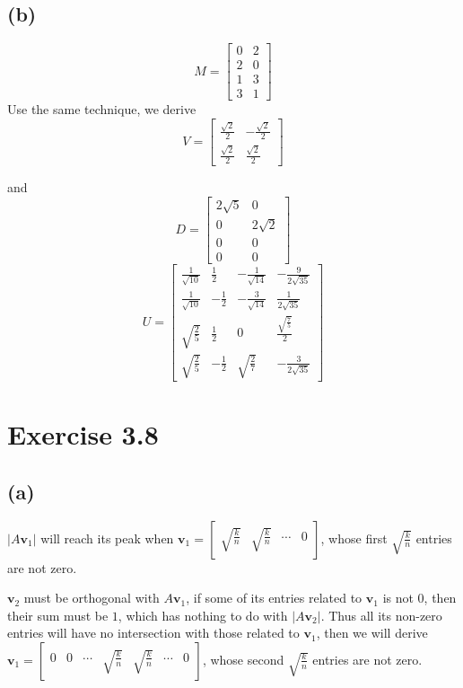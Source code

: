 \documentclass[paper=a4, fontsize=11pt]{scrartcl} %
\numberwithin{equation}{section} %
\numberwithin{figure}{section} %
\numberwithin{table}{section} %
\begin{document}
\subsection*{(b)}
$$ M = \begin{bmatrix}0 & 2 \\ 2 & 0 \\ 1 & 3 \\ 3 & 1\end{bmatrix}$$
Use the same technique, we derive 
$$V = \begin{bmatrix}\frac{\sqrt{2}}{2} & -\frac{\sqrt{2}}{{2}} \\ \frac{\sqrt{2}}{2} & \frac{\sqrt{2}}{2} \end{bmatrix} $$

and $$D = \begin{bmatrix}2\sqrt{5} & 0 \\ 0 & 2\sqrt{2} \\ 0 & 0 \\ 0 & 0 \end{bmatrix} $$
$$U = \begin{bmatrix} 
\frac{1}{\sqrt{10}} & \frac{1}{2} & -\frac{1}{\sqrt{14}} & -\frac{9}{2\sqrt{35}}	\\
\frac{1}{\sqrt{10}} & -\frac{1}{2} & -\frac{3}{\sqrt{14}} & \frac{1}{2\sqrt{35}}	\\
\sqrt{\frac{2}{5}} & \frac{1}{2} & 0 & \frac{\sqrt{\frac{7}{5}}}{2}	\\
\sqrt{\frac{2}{5}} & -\frac{1}{2} & \sqrt{\frac{2}{7}} & -\frac{3}{2\sqrt{35}}
\end{bmatrix} $$
\section*{Exercise 3.8}
\subsection*{(a)}
$|A\mathbf{v}_1|$ will reach its peak when $\mathbf{v}_1 = \begin{bmatrix}\sqrt{\frac{k}{n}} & \sqrt{\frac{k}{n}} & \cdots & 0\end{bmatrix}$, whose first $\sqrt{\frac{k}{n}}$ entries are not zero.

$\mathbf{v}_2$ must be orthogonal with $A\mathbf{v}_1$, if some of its entries related to $\mathbf{v}_1$ is not $0$, then their sum must be $1$, which has nothing to do with $|A\mathbf{v}_2|$. Thus all its non-zero entries will have no intersection with those related to $\mathbf{v}_1$, then we will derive $\mathbf{v}_1 = \begin{bmatrix}0 & 0 & \cdots & \sqrt{\frac{k}{n}} & \sqrt{\frac{k}{n}} & \cdots & 0\end{bmatrix}$, whose second $\sqrt{\frac{k}{n}}$ entries are not zero.
\end{document}
